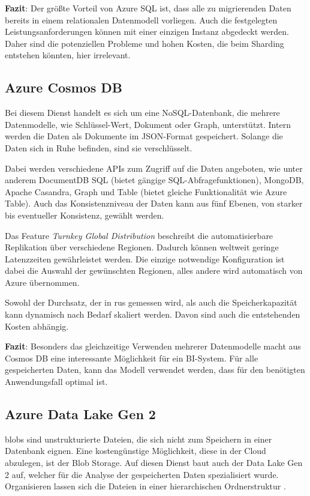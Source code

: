 \textbf{Fazit}: Der größte Vorteil von Azure SQL ist, dass alle zu migrierenden Daten bereits in einem relationalen Datenmodell vorliegen. Auch die festgelegten Leistungsanforderungen können mit einer einzigen Instanz abgedeckt werden. Daher sind die potenziellen Probleme und hohen Kosten, die beim Sharding entstehen könnten, hier irrelevant.

\subsection{Azure Cosmos DB} \label{sec:grundlagen:azure_dienste:cosmosDB}
Bei diesem Dienst handelt es sich um eine NoSQL-Datenbank, die mehrere Datenmodelle, wie Schlüssel-Wert, Dokument oder Graph, unterstützt. Intern werden die Daten als Dokumente im JSON-Format gespeichert. Solange die Daten sich in Ruhe befinden, sind sie verschlüsselt.

Dabei werden verschiedene APIs zum Zugriff auf die Daten angeboten, wie unter anderem DocumentDB SQL (bietet gängige SQL-Abfragefunktionen), MongoDB, Apache Casandra, Graph und Table (bietet gleiche Funktionalität wie Azure Table). Auch das Konsistenzniveau der Daten kann aus fünf Ebenen, von starker bis eventueller Konsistenz, gewählt werden.

Das Feature \textit{Turnkey Global Distribution} beschreibt die automatisierbare Replikation über verschiedene Regionen. Dadurch können weltweit geringe Latenzzeiten gewährleistet werden. Die einzige notwendige Konfiguration ist dabei die Auswahl der gewünschten Regionen, alles andere wird automatisch von Azure übernommen.

Sowohl der Durchsatz, der in \acp{ru} gemessen wird, als auch die Speicherkapazität kann dynamisch nach Bedarf skaliert werden. Davon sind auch die entstehenden Kosten abhängig.
\cite{guay_paz_microsoft_2018}\cite{mrzyglod_hands-azure_2018}

\textbf{Fazit}: Besonders das gleichzeitige Verwenden mehrerer Datenmodelle macht aus Cosmos DB eine interessante Möglichkeit für ein BI-System. Für alle gespeicherten Daten, kann das Modell verwendet werden, dass für den benötigten Anwendungsfall optimal ist.

\subsection{Azure Data Lake Gen 2} \label{sec:grundlagen:azure_dienste:dataLake}
\acp{blob} sind unstrukturierte Dateien, die sich nicht zum Speichern in einer Datenbank eignen. Eine kostengünstige Möglichkeit, diese in der Cloud abzulegen, ist der Blob Storage. Auf diesen Dienst baut auch der Data Lake Gen 2 auf, welcher für die Analyse der gespeicherten Daten spezialisiert wurde. Organisieren lassen sich die Dateien in einer hierarchischen Ordnerstruktur \cite{soh_microsoft_2020}.

